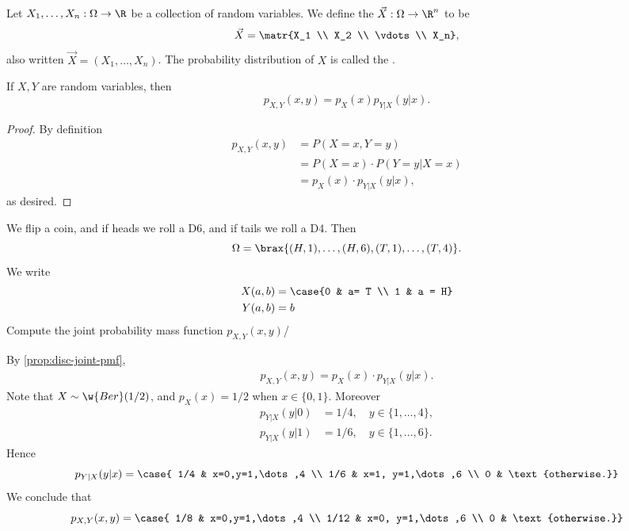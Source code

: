 \documentclass[11pt]{article}
\begin{document}
\begin{defn}
Let $X_1,\dots,X_n : \Omega \to \R$ be a collection of random variables. We define the  $\vec X:\Omega \to \R^n$ to be \[
\vec X = \matr{X_1 \\ X_2 \\ \vdots \\ X_n},
\]
also written $\vec X = (X_1,\dots,X_n)$.  The probability distribution of $X$ is called the .
\end{defn}

\begin{prop} \label{prop:disc-joint-pmf}
If $X,Y$ are random variables, then
\[
p_{X,Y}(x,y)=p_X(x)p_{Y|X}(y|x).
\]
\end{prop}

\begin{proof}
By definition
\begin{align*}
    p_{X,Y}(x,y) &= P(X=x,Y=y) \\ &=P(X=x)\cdot P(Y=y|X=x) \\
    &= p_X(x)\cdot p_{Y|X}(y|x),
\end{align*}
as desired.
\end{proof}

\begin{ex} \label{ex:joint-coin-dice}
We flip a coin, and if heads we roll a D6, and if tails we roll a D4. Then 
\[
\Omega = \brax{ (H,1),\dots,(H,6),(T,1),\dots,(T,4)}.
\]
We write
\begin{align*}
X(a,b) &=\case{0 & a= T \\ 1 & a = H} \\
Y(a,b) &= b
\end{align*}
Compute the joint probability mass function $p_{X,Y}(x,y)$/
\end{ex}

\begin{solution}
By \cref{prop:disc-joint-pmf},
\begin{align*}
    p_{X,Y}(x,y) = p_X(x)\cdot p_{Y|X}(y|x).
\end{align*}
Note that $X\sim \w{Ber}(1/2)$, and $p_X(x)=1/2$ when $x \in \{0,1\}$. Moreover
\begin{align*}
    p_{Y|X}(y|0) &= 1/4, \quad y \in \{1,\dots,4\}, \\
    p_{Y|X}(y|1) &= 1/6, \quad y \in \{1,\dots,6\}.
\end{align*}
Hence
\[
p_{Y|X}(y|x) = \case{ 1/4 & x=0,y=1,\dots,4 \\ 1/6 & x=1, y=1,\dots,6 \\ 0 & \text{otherwise.}}
\]
We conclude that
\[
p_{X,Y}(x,y)= \case{ 1/8 & x=0,y=1,\dots,4 \\ 1/12 & x=0, y=1,\dots,6 \\ 0 & \text{otherwise.}}
\]
\end{solution}
\end{document}
